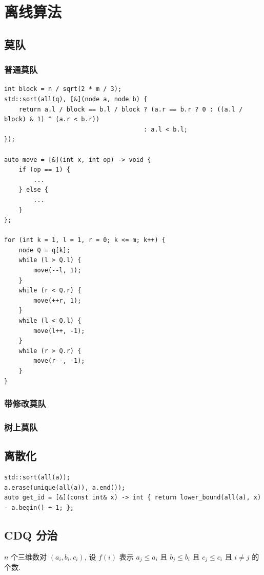 \documentclass[UTF8, a4paper, titlepage, twoside]{ctexart}
\begin{document}
\newpage
\section{离线算法}

\subsection{ 莫队 }
\subsubsection{ 普通莫队 }
\begin{lstlisting}
int block = n / sqrt(2 * m / 3);
std::sort(all(q), [&](node a, node b) {
    return a.l / block == b.l / block ? (a.r == b.r ? 0 : ((a.l / block) & 1) ^ (a.r < b.r))
                                      : a.l < b.l;
});

auto move = [&](int x, int op) -> void {
    if (op == 1) {
        ...
    } else {
        ...
    }
};

for (int k = 1, l = 1, r = 0; k <= m; k++) {
    node Q = q[k];
    while (l > Q.l) {
        move(--l, 1);
    }
    while (r < Q.r) {
        move(++r, 1);
    }
    while (l < Q.l) {
        move(l++, -1);
    }
    while (r > Q.r) {
        move(r--, -1);
    }
}
\end{lstlisting}

\subsubsection{ 带修改莫队 }

\subsubsection{ 树上莫队 }

\subsection{ 离散化 }
\begin{lstlisting}
std::sort(all(a));
a.erase(unique(all(a)), a.end());
auto get_id = [&](const int& x) -> int { return lower_bound(all(a), x) - a.begin() + 1; };
\end{lstlisting}

\subsection{ CDQ 分治 }
$n$ 个三维数对 $(a_i, b_i, c_i)$, 设 $f(i)$ 表示 $a_j \leqslant a_i$ 且 $b_j \leqslant b_i$ 且  $c_j \leqslant c_i$ 且 $i \neq j$ 的个数. 
\end{document}
